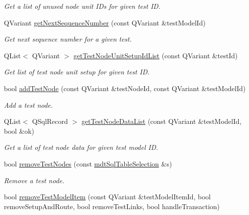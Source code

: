 \begin{DoxyCompactItemize}
\begin{DoxyCompactList}\small\item\em Get a list of unused node unit I\-Ds for given test I\-D. \end{DoxyCompactList}\item 
Q\-Variant \hyperlink{classmdt_tt_test_model_aa1db929c8f78953623a75b44ac596feb}{get\-Next\-Sequence\-Number} (const Q\-Variant \&test\-Model\-Id)
\begin{DoxyCompactList}\small\item\em Get next sequence number for a given test. \end{DoxyCompactList}\item 
Q\-List$<$ Q\-Variant $>$ \hyperlink{classmdt_tt_test_model_a75240a9cda2c24977e5b8a287ece10c8}{get\-Test\-Node\-Unit\-Setup\-Id\-List} (const Q\-Variant \&test\-Id)
\begin{DoxyCompactList}\small\item\em Get list of test node unit setup for given test I\-D. \end{DoxyCompactList}\item 
bool \hyperlink{classmdt_tt_test_model_a5dcbe2d3985231c373633f3b87e26f98}{add\-Test\-Node} (const Q\-Variant \&test\-Node\-Id, const Q\-Variant \&test\-Model\-Id)
\begin{DoxyCompactList}\small\item\em Add a test node. \end{DoxyCompactList}\item 
Q\-List$<$ Q\-Sql\-Record $>$ \hyperlink{classmdt_tt_test_model_abd80be6eff82a9567524730c88758c89}{get\-Test\-Node\-Data\-List} (const Q\-Variant \&test\-Model\-Id, bool \&ok)
\begin{DoxyCompactList}\small\item\em Get a list of test node data for given test model I\-D. \end{DoxyCompactList}\item 
bool \hyperlink{classmdt_tt_test_model_a039e7d3cc5a07bf6bdf0e76d4d6465bb}{remove\-Test\-Nodes} (const \hyperlink{classmdt_sql_table_selection}{mdt\-Sql\-Table\-Selection} \&s)
\begin{DoxyCompactList}\small\item\em Remove a test node. \end{DoxyCompactList}\item 
bool \hyperlink{classmdt_tt_test_model_a6bc5f3452ea5b0e71a3625eaf001638c}{remove\-Test\-Model\-Item} (const Q\-Variant \&test\-Model\-Item\-Id, bool remove\-Setup\-And\-Route, bool remove\-Test\-Links, bool handle\-Transaction)

\end{DoxyCompactItemize}
